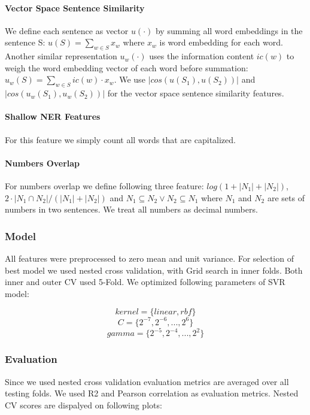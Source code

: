 \documentclass[10pt, a4paper]{article}
\begin{document}
\begin{table}[h!]
\paragraph{Vector Space Sentence Similarity \\}
We define each sentence as vector $u(\cdot)$ by summing all word embeddings in the sentence S: $ u(S) = \sum_{w \in S} x_w$ where $x_w$ is word embedding for each word. Another similar
representation $u_w(\cdot)$ uses the information content
$ic(w)$ to weigh the word embedding vector of each word
before summation: $u_w(S) = \sum_{w \in S} ic(w) \cdot x_w.$
We use $|cos(u(S_1), u(S_2))|$ and $|cos(u_w(S_1), u_w(S_2))|$ for the vector space sentence similarity features. \citep{Saric2012TakeLabSF}
\paragraph{Shallow NER Features \\}
For this feature we simply count all words that are capitalized.
\paragraph{Numbers Overlap \\}
For numbers overlap we define following three feature: $log(1+|N_1|+|N_2|)$, $2\cdot|N_1 \cap N_2|/(|N_1|+|N_2|)$ and $N_1 \subseteq N_2 \vee N_2 \subseteq N_1$
where $N_1$ and $N_2$ are sets of numbers in two sentences. We treat all numbers as decimal numbers.

\subsubsection{Model}
All features were preprocessed to zero mean and unit variance. For selection of best model we used nested cross validation, with Grid search in inner folds. Both inner and outer CV used 5-Fold. We optimized following parameters of SVR model:

\[ kernel = \{ linear, rbf \} \]
\[ C = \{ 2^{-7},2^{-6}, ..., 2^6 \} \]
\[ gamma = \{ 2^{-5}, 2^{-4},..., 2^2 \} \]

\subsubsection{Evaluation}
Since we used nested cross validation evaluation metrics are averaged over all testing folds. We used R2 and Pearson correlation as evaluation metrics. Nested CV scores are dispalyed on following plots:



\end{table}
\end{document}
